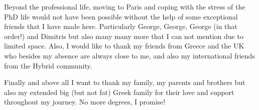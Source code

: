 Beyond the professional life, moving to Paris and coping with the stress of the PhD life would not have been possible without the help of some exceptional friends that I have made here. Particularly George, George, George (in that order!) and Dimitris but also many many more that I can not mention due to limited space. Also, I would like to thank my friends from Greece and the UK who besides my absence are always close to me, and also my international friends from the Hybrid community.

Finally and above all I want to thank my family, my parents and brothers but also my extended big (but not fat) Greek family for their love and support throughout my journey. No more degrees, I promise!


